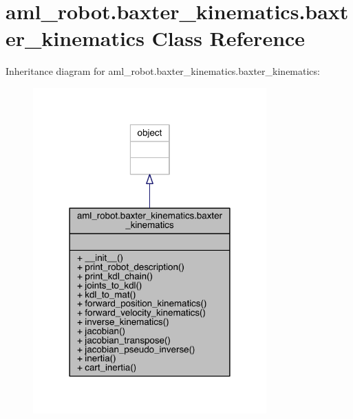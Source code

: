 \hypertarget{classaml__robot_1_1baxter__kinematics_1_1baxter__kinematics}{}\section{aml\+\_\+robot.\+baxter\+\_\+kinematics.\+baxter\+\_\+kinematics Class Reference}
\label{classaml__robot_1_1baxter__kinematics_1_1baxter__kinematics}


Inheritance diagram for aml\+\_\+robot.\+baxter\+\_\+kinematics.\+baxter\+\_\+kinematics\+:
\nopagebreak
\begin{figure}[H]
\begin{center}
\leavevmode
\includegraphics[width=254pt]{classaml__robot_1_1baxter__kinematics_1_1baxter__kinematics__inherit__graph}
\end{center}
\end{figure}


